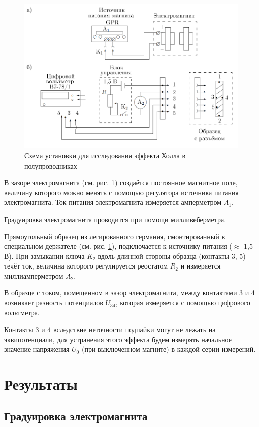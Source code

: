\documentclass[12pt,a4paper]{article}
\newcommand{\figref}[1]{(см. рис. \ref{#1})}
\begin{document}
	\begin{figure}[h]
		\includegraphics[scale=0.65]{res/scheme.png}
		\caption{Схема установки для исследования эффекта Холла в полупроводниках}
		\label{scheme}
	\end{figure}
	
	В зазоре электромагнита \figref{scheme} создаётся постоянное магнитное поле, величину которого можно менять с помощью регуля­тора источника питания электромагнита. Ток питания электромагни­та измеряется амперметром $A_1$.
	
	Градуировка электромагнита проводится при помощи милливеберметра.
	
	Прямоугольный образец из легированного германия, смонтирован­ный в специальном держателе \figref{scheme}, подключается к источнику пита­ния ($\approx$ 1,5 В). При замыкании ключа $K_2$ вдоль длинной стороны образца (контакты 3, 5) течёт ток, величина которого регулируется реостатом $R_2$ и измеряется миллиамперметром $A_2$.
	
	В образце с током, помещенном в зазор электромагнита, между контактами 3 и 4 возникает разность потенциалов $U_{34}$, которая измеряется с помощью цифрового вольтметра.
	
	Контакты 3 и 4 вследствие неточности подпайки могут не лежать на эквипотенциали, для устранения этого эффекта будем измерять начальное значение напряжения $U_0$ (при выключенном магните) в каждой серии измерений.

	\section*{Результаты}
	
	\subsection*{Градуировка электромагнита}
	
\end{document}
